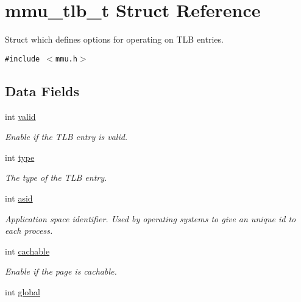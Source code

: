 \hypertarget{structmmu__tlb__t}{
\section{mmu\_\-tlb\_\-t Struct Reference}
\label{structmmu__tlb__t}
}
Struct which defines options for operating on TLB entries.  


{\tt \#include $<$mmu.h$>$}

\subsection*{Data Fields}
\begin{CompactItemize}
\item 
\hypertarget{structmmu__tlb__t_4925d045a0fed4432040de62f9fed980}{
int \hyperlink{structmmu__tlb__t_4925d045a0fed4432040de62f9fed980}{valid}}
\label{structmmu__tlb__t_4925d045a0fed4432040de62f9fed980}

\begin{CompactList}\small\item\em Enable if the TLB entry is valid. \item\end{CompactList}\item 
int \hyperlink{structmmu__tlb__t_6bb98a71abde4276e7f57bb8d35492cb}{type}
\begin{CompactList}\small\item\em The type of the TLB entry. \item\end{CompactList}\item 
\hypertarget{structmmu__tlb__t_fa4d92c6ae1107a5a6b6256a8e39f1c1}{
int \hyperlink{structmmu__tlb__t_fa4d92c6ae1107a5a6b6256a8e39f1c1}{asid}}
\label{structmmu__tlb__t_fa4d92c6ae1107a5a6b6256a8e39f1c1}

\begin{CompactList}\small\item\em Application space identifier. Used by operating systems to give an unique id to each process. \item\end{CompactList}\item 
\hypertarget{structmmu__tlb__t_89a065dc5db82b1fce12b5869c7b55f5}{
int \hyperlink{structmmu__tlb__t_89a065dc5db82b1fce12b5869c7b55f5}{cachable}}
\label{structmmu__tlb__t_89a065dc5db82b1fce12b5869c7b55f5}

\begin{CompactList}\small\item\em Enable if the page is cachable. \item\end{CompactList}\item 
\hypertarget{structmmu__tlb__t_4cdcad5d1918a5ac1cd70ccc0e5681eb}{
int \hyperlink{structmmu__tlb__t_4cdcad5d1918a5ac1cd70ccc0e5681eb}{global}}
\label{structmmu__tlb__t_4cdcad5d1918a5ac1cd70ccc0e5681eb}


\end{CompactItemize}

